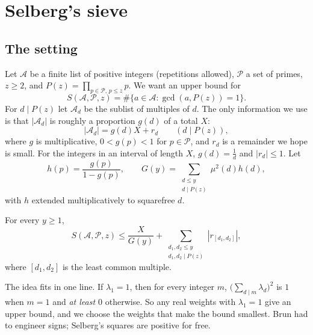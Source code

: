\section{Selberg's sieve}

\subsection*{The setting}

Let $\mathcal A$ be a finite list of positive integers (repetitions allowed), $\mathcal P$ a set of primes, $z\ge2$, and $P(z)=\prod_{p\in\mathcal P,\,p\le z}p$. We want an upper bound for
\[
S(\mathcal A,\mathcal P,z)=\#\{a\in\mathcal A:\gcd(a,P(z))=1\}.
\]
For $d\mid P(z)$ let $\mathcal A_d$ be the sublist of multiples of $d$. The only information we use is that $|\mathcal A_d|$ is roughly a proportion $g(d)$ of a total $X$:
\[
|\mathcal A_d|=g(d)X+r_d\qquad(d\mid P(z)),
\]
where $g$ is multiplicative, $0<g(p)<1$ for $p\in\mathcal P$, and $r_d$ is a remainder we hope is small. For the integers in an interval of length $X$, $g(d)=\frac1d$ and $|r_d|\le1$. Let
\[
h(p)=\frac{g(p)}{1-g(p)},\qquad G(y)=\sum_{\substack{d\le y\\d\mid P(z)}}\mu^2(d)h(d),
\]
with $h$ extended multiplicatively to squarefree $d$.

\begin{theorem}[Selberg, 1947]\label{thm:selberg}
For every $y\ge1$,
\[
S(\mathcal A,\mathcal P,z)\le\frac X{G(y)}+\sum_{\substack{d_1,d_2\le y\\d_1,d_2\mid P(z)}}|r_{[d_1,d_2]}|,
\]
where $[d_1,d_2]$ is the least common multiple.
\end{theorem}

The idea fits in one line. If $\lambda_1=1$, then for every integer $m$, $\bigl(\sum_{d\mid m}\lambda_d\bigr)^2$ is $1$ when $m=1$ and \emph{at least $0$} otherwise. So any real weights with $\lambda_1=1$ give an upper
bound, and we choose the weights that make the bound smallest. Brun had to engineer signs; Selberg's squares are positive for free.


